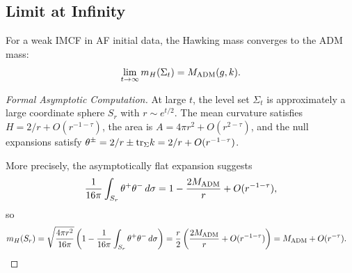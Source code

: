 \subsection{Limit at Infinity}
\begin{proposition}
For a weak IMCF in AF initial data, the Hawking mass converges to the ADM mass:
\begin{equation}
    \lim_{t \to \infty} m_H(\Sigma_t) = M_{\mathrm{ADM}}(g, k).
\end{equation}
\end{proposition}

\begin{proof}[Formal Asymptotic Computation]
At large $t$, the level set $\Sigma_t$ is approximately a large coordinate sphere $S_r$ with $r \sim e^{t/2}$. The mean curvature satisfies $H = 2/r + O(r^{-1-\tau})$, the area is $A = 4\pi r^2 + O(r^{2-\tau})$, and the null expansions satisfy $\theta^\pm = 2/r \pm \mathrm{tr}_\Sigma k = 2/r + O(r^{-1-\tau})$.

More precisely, the asymptotically flat expansion suggests
\begin{equation}
\frac{1}{16\pi}\int_{S_r} \theta^+\theta^-\, d\sigma 
= 1 - \frac{2M_{\mathrm{ADM}}}{r} + O(r^{-1-\tau}),
\end{equation}
so
\begin{align}
m_H(S_r)
&= \sqrt{\frac{4\pi r^2}{16\pi}}\left(1-\frac{1}{16\pi}\int_{S_r}\theta^+\theta^-\,d\sigma\right)
= \frac{r}{2}\left(\frac{2M_{\mathrm{ADM}}}{r}+O(r^{-1-\tau})\right)
= M_{\mathrm{ADM}}+O(r^{-\tau}).
\end{align}
\end{proof}
